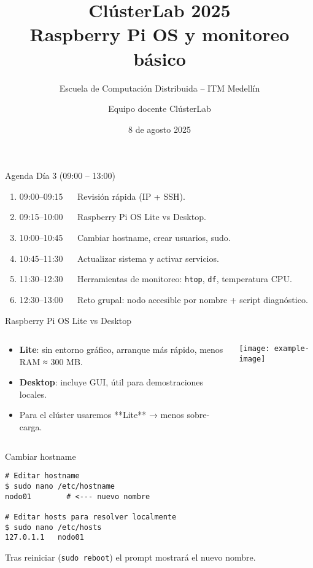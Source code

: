 \documentclass[aspectratio=169, professionalfonts]{beamer}
\title[ClústerLab • Día 3]{ClústerLab 2025\\\huge Raspberry Pi OS y monitoreo básico}
\subtitle{Escuela de Computación Distribuida – ITM Medellín}
\author{Equipo docente ClústerLab}
\date{8 de agosto 2025}
\begin{document}
\begin{frame}[plain]
  \titlepage
\end{frame}

\begin{frame}{Agenda Día 3 (09:00 – 13:00)}
\begin{enumerate}
  \item 09:00–09:15   Revisión rápida (IP + SSH).  
  \item 09:15–10:00   Raspberry Pi OS Lite vs Desktop.  
  \item 10:00–10:45   Cambiar hostname, crear usuarios, sudo.  
  \item 10:45–11:30   Actualizar sistema y activar servicios.  
  \item 11:30–12:30   Herramientas de monitoreo: \texttt{htop}, \texttt{df}, temperatura CPU.  
  \item 12:30–13:00   Reto grupal: nodo accesible por nombre + script diagnóstico.  
\end{enumerate}
\end{frame}

\begin{frame}{Raspberry Pi OS Lite vs Desktop}
\begin{columns}[T]
\begin{column}{0.55\textwidth}
\begin{itemize}
  \item \textbf{Lite}: sin entorno gráfico, arranque más rápido, menos RAM ≈ 300 MB.  
  \item \textbf{Desktop}: incluye GUI, útil para demostraciones locales.  
  \item Para el clúster usaremos **Lite** → menos sobre-carga.  
\end{itemize}
\end{column}
\begin{column}{0.4\textwidth}
  \centering\texttt{[image: example-image]}
\end{column}
\end{columns}
\end{frame}

\begin{frame}[fragile]{Cambiar hostname}
\begin{verbatim}
# Editar hostname
$ sudo nano /etc/hostname
nodo01        # <--- nuevo nombre

# Editar hosts para resolver localmente
$ sudo nano /etc/hosts
127.0.1.1   nodo01
\end{verbatim}
Tras reiniciar (\texttt{sudo reboot}) el prompt mostrará el nuevo nombre.
\end{frame}
\end{document}
